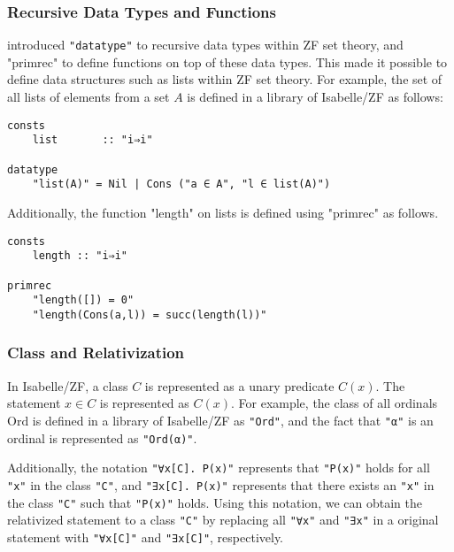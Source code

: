 \documentclass{report}
\newenvironment{isaframe}{\begin{mdframed}[topline=false, rightline=false, bottomline=false]}{\end{mdframed}}
\begin{document}
\subsubsection{Recursive Data Types and Functions}
\cite{paulson_datatype_impl} introduced \texttt{"datatype"} to recursive data types within ZF set theory, 
and "primrec" to define functions on top of these data types. 
This made it possible to define data structures such as lists within ZF set theory.
For example, the set of all lists of elements from a set $A$ is defined in a library of Isabelle/ZF as follows:
\begin{isaframe}
\begin{verbatim}
consts
    list       :: "i⇒i"

datatype
    "list(A)" = Nil | Cons ("a ∈ A", "l ∈ list(A)")
\end{verbatim}
\end{isaframe}
Additionally, the function "length" on lists is defined using "primrec" as follows.
\begin{isaframe}
\begin{verbatim}
consts
    length :: "i⇒i"

primrec
    "length([]) = 0"
    "length(Cons(a,l)) = succ(length(l))"
\end{verbatim}
\end{isaframe}


\subsubsection{Class and Relativization}
In Isabelle/ZF, a class $C$ is represented as a unary predicate $C(x)$.
The statement $x \in C$ is represented as $C(x)$.
For example, the class of all ordinals $\mathrm{Ord}$ is defined in a library of Isabelle/ZF as \texttt{"Ord"},
and the fact that \texttt{"α"} is an ordinal is represented as \texttt{"Ord(α)"}.

Additionally, the notation \texttt{"∀x[C]. P(x)"} represents that \texttt{"P(x)"} holds for all \texttt{"x"} in the class \texttt{"C"},
and \texttt{"∃x[C]. P(x)"} represents that there exists an \texttt{"x"} in the class \texttt{"C"} such that \texttt{"P(x)"} holds.
Using this notation, we can obtain the relativized statement to a class \texttt{"C"} 
by replacing all \texttt{"∀x"} and \texttt{"∃x"} in a original statement with \texttt{"∀x[C]"} and \texttt{"∃x[C]"}, respectively.
\end{document}
